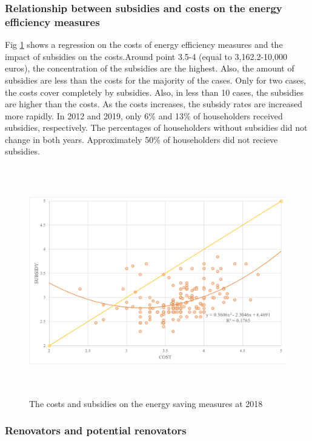 \documentclass[preprint,12pt,3p]{elsarticle}
\begin{document}
\subsubsection{Relationship between subsidies and costs on the energy efficiency measures}

Fig {\ref{fig:5}} shows a regression on the costs of energy efficiency measures and the impact of subsidies on the costs.Around point 3.5-4 (equal to 3,162.2-10,000 euros), the concentration of the subsidies are the highest. Also, the amount of subsidies are less than the costs for the majority of the cases. Only for two cases, the costs cover completely by subsidies. Also, in less than 10 cases, the subsidies are higher than the costs. As the costs increases, the subsidy rates are increased more rapidly. In 2012 and 2019, only 6\% and 13\% of householders received subsidies, respectively. The percentages of householders without subsidies did not change in both years. Approximately 50\% of householders did not recieve subsidies.       

\begin{figure}[H]
    \centering
    \includegraphics[width=15cm, height=10cm, clip, trim=4 4 4 4, clip]{SC.png}
    \caption{The costs and subsidies on the energy saving measures at 2018}
    \label{fig:5}
\end{figure}



\subsubsection{Renovators and potential renovators}
\end{document}
